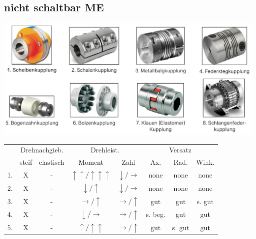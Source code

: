 \subsection{nicht schaltbar \hfill ME}
    \begin{footnotesize}
        \begin{center}
            \includegraphics[width = 1.0\linewidth]{MAEIP_Kupplungen_nichtschaltbar}
                \begin{scriptsize}
                    \begin{tabular}{|c|c|c|c|c|c|c|c|}
                    \hline
                    \multirow{2}{0.01cm}{\null}& \multicolumn{2}{p{1.2cm}|}{\centering Drehnachgieb.} & \multicolumn{2}{p{0.9cm}|}{\centering Drehleist.} & \multicolumn{3}{p{0.9cm}|}{\centering Versatz} \bigstrut \\
                    \cline{2-8} & \multicolumn{1}{c|}{steif} & \multicolumn{1}{c|}{elastisch} & \multicolumn{1}{c|}{Moment} & \multicolumn{1}{c|}{Zahl} & \multicolumn{1}{c|}{Ax.} & \multicolumn{1}{c|}{Rad.} & \multicolumn{1}{c|}{Wink.} \bigstrut \\ \hline
                    1. & X & - & $\uparrow \uparrow / \uparrow\uparrow\uparrow$ & $\downarrow / \to$& none & none & none \bigstrut \\
                    \hline
                    2. & X & - & $\downarrow / \uparrow$ & $\downarrow / \to$ & none & none & none\bigstrut \\
                    \hline
                    3. & X & - & $\to / \uparrow$ & $\to / \uparrow$ & gut & gut & s. gut\bigstrut \\
                    \hline
                    4. & X & - & $\downarrow / \to$ & $\to / \uparrow$ & s. beg. & gut & gut\bigstrut \\
                    \hline
                    5. & X & - & $\uparrow / \uparrow\uparrow$ & $\to / \uparrow$ & gut & s. gut & gut\bigstrut \\

\end{tabular}
\end{scriptsize}
\end{center}
\end{footnotesize}
